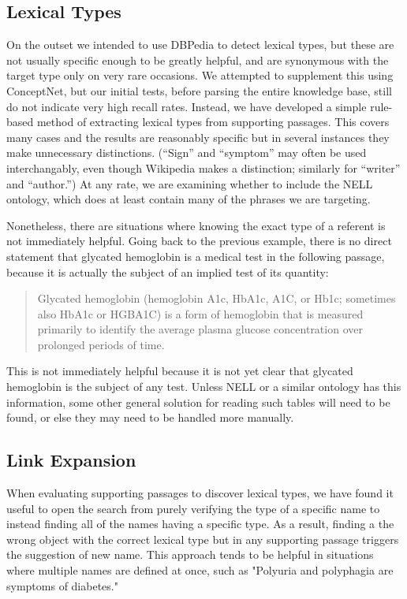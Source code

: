 \documentclass[12pt,letterpaper]{article}
\begin{document}
\subsection{Lexical Types}
On the outset we intended to use DBPedia to detect lexical types, but these are not usually specific enough to be greatly helpful, and are synonymous with the target type only on very rare occasions. We attempted to supplement this using ConceptNet, but our initial tests, before parsing the entire knowledge base, still do not indicate very high recall rates. Instead, we have developed a simple rule-based method of extracting lexical types from supporting passages. This covers many cases and the results are reasonably specific but in several instances they make unnecessary distinctions. (``Sign'' and ``symptom'' may often be used interchangably, even though Wikipedia makes a distinction; similarly for ``writer'' and ``author.'') At any rate, we are examining whether to include the NELL ontology, which does at least contain many of the phrases we are targeting.

Nonetheless, there are situations where knowing the exact type of a referent is not immediately helpful. Going back to the previous example, there is no direct statement that glycated hemoglobin is a medical test in the following passage, because it is actually the subject of an implied test of its quantity:
\begin{quote}
Glycated hemoglobin (hemoglobin A1c, HbA1c, A1C, or Hb1c; sometimes also HbA1c or HGBA1C) is a form of hemoglobin that is measured primarily to identify the average plasma glucose concentration over prolonged periods of time.
\end{quote}
This is not immediately helpful because it is not yet clear that glycated hemoglobin is the subject of any test. Unless NELL or a similar ontology has this information, some other general solution for reading such tables will need to be found, or else they may need to be handled more manually.

\subsection{Link Expansion}
When evaluating supporting passages to discover lexical types, we have found it useful to open the search from purely verifying the type of a specific name to instead finding all of the names having a specific type. As a result, finding a the wrong object with the correct lexical type but in any supporting passage triggers the suggestion of new name. This approach tends to be helpful in situations where multiple names are defined at once, such as "Polyuria and polyphagia are symptoms of diabetes."
\end{document}
